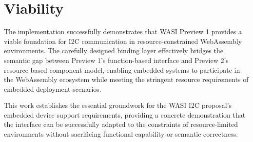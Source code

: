 
\section{Viability}
The implementation successfully demonstrates that WASI Preview 1 provides a viable foundation for I2C communication in resource-constrained WebAssembly environments. The carefully designed binding layer effectively bridges the semantic gap between Preview 1's function-based interface and Preview 2's resource-based component model, enabling embedded systems to participate in the WebAssembly ecosystem while meeting the stringent resource requirements of embedded deployment scenarios.

This work establishes the essential groundwork for the WASI I2C proposal's embedded device support requirements, providing a concrete demonstration that the interface can be successfully adapted to the constraints of resource-limited environments without sacrificing functional capability or semantic correctness.

